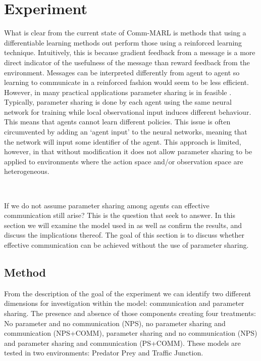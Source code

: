 \documentclass{article}
\begin{document}
\newpage

\section{Experiment}

What is clear from the current state of Comm-MARL is methods that using a differentiable learning methods out perform those using a reinforced learning technique. Intuitively, this is because gradient feedback from a message is a more direct indicator of the usefulness of the message than reward feedback from the environment. Messages can be interpreted differently from agent to agent so learning to communicate in a reinforced fashion would seem to be less efficient. However, in many practical applications parameter sharing is in feasible \citep{wong2022deep}. Typically, parameter sharing is done by each agent using the same neural network for training while local observational input induces different behaviour. This means that agents cannot learn different policies. \citep{terry2023revisiting} This issue is often circumvented by adding an `agent input' to the neural networks, meaning that the network will input some identifier of the agent. This approach is limited, however, in that without modification it does not allow parameter sharing to be applied to environments where the action space and/or observation space are heterogeneous.

\

If we do not assume parameter sharing among agents can effective communication still arise? This is the question that \citet{pina2024fully} seek to answer. In this section we will examine the model used in \citet{pina2024fully} as well as  confirm the results, and discuss the implications thereof. The goal of this section is to discuss whether effective communication can be achieved without the use of parameter sharing.

\subsection{Method}

From the description of the goal of the experiment we can identify two different dimensions for investigation within the model: communication and parameter sharing. The presence and absence of those components creating four treatments: No parameter and no communication (NPS), no parameter sharing and communication (NPS+COMM), parameter sharing and no communication (NPS) and parameter sharing and communication (PS+COMM). These models are tested in two environments: Predator Prey and Traffic Junction. \citep{sukhbaatar2016commnet}
\end{document}
